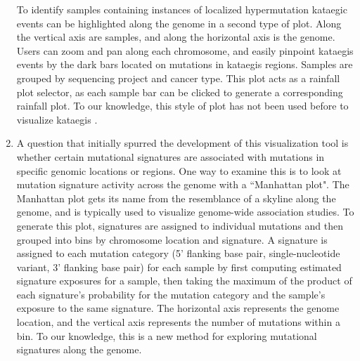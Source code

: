 \documentclass[12pt, letterpaper]{article}
\begin{document}
\begin{enumerate}
To identify samples containing instances of localized hypermutation kataegic events can be highlighted along the genome in a second type of plot.
Along the vertical axis are samples, and along the horizontal axis is the genome.
Users can zoom and pan along each chromosome, and easily pinpoint kataegis events by the dark bars located on mutations in kataegis regions.
Samples are grouped by sequencing project and cancer type.
This plot acts as a rainfall plot selector, as each sample bar can be clicked to generate a corresponding rainfall plot.
To our knowledge, this style of plot has not been used before to visualize kataegis .
    
\item A question that initially spurred the development of this visualization tool is whether certain mutational signatures are associated with mutations in specific genomic locations or regions.
One way to examine this is to look at mutation signature activity across the genome with a ``Manhattan plot".
The Manhattan plot gets its name from the resemblance of a skyline along the genome, and is typically used to visualize genome-wide association studies\cite{gibson2010hints}.
To generate this plot, signatures are assigned to individual mutations and then grouped into bins by chromosome location and signature.
A signature is assigned to each mutation category (5' flanking base pair, single-nucleotide variant, 3' flanking base pair) for each sample by first computing estimated signature exposures for a sample, then taking the maximum of the product of each signature's probability for the mutation category and the sample's exposure to the same signature.
The horizontal axis represents the genome location, and the vertical axis represents the number of mutations within a bin.
To our knowledge, this is a new method for exploring mutational signatures along the genome.

\end{enumerate}
\end{document}
